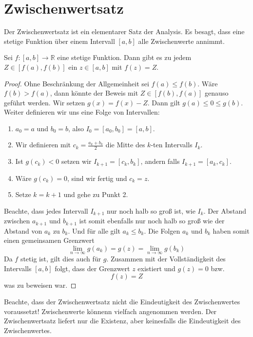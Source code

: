 \section{Zwischenwertsatz}

Der Zwischenwertsatz ist ein elementarer Satz der Analysis. Es besagt, dass eine stetige Funktion über einem Intervall $[a,b]$ alle Zwischenwerte annimmt.

\begin{satz}[Zwischenwertsatz]\label{satz:zwischen}
Sei $f:[a,b]\longrightarrow \mathbb{R}$ eine stetige Funktion. Dann gibt es zu jedem $Z\in[f(a),f(b)]$ ein $z\in [a,b]$ mit $f(z)=Z$.
\end{satz}
\begin{proof}
Ohne Beschränkung der Allgemeinheit sei $f(a)\le f(b)$. Wäre $f(b)>f(a)$, dann könnte der Beweis mit $Z\in[f(b),f(a)]$ genauso geführt werden. Wir setzen $g(x) = f(x)-Z$. Dann gilt $g(a)\le 0 \le g(b)$. Weiter definieren wir uns eine Folge von Intervallen:

\begin{enumerate}
\item $a_0 = a$ und $b_0 = b$, also $I_0 = [a_0,b_0]=[a,b]$.
\item Wir definieren mit $c_k = \frac{a_k +b_k}{2}$ die Mitte des $k$-ten Intervalls $I_k$.
\item Ist $g(c_k)<0$ setzen wir $I_{k+1} = [c_k,b_k]$, andern falls $I_{k+1}=[a_k,c_k]$.
\item Wäre $g(c_k)=0$, sind wir fertig und $c_k=z$.
\item Setze $k=k+1$ und gehe zu Punkt 2.
\end{enumerate}
Beachte, dass jedes Intervall $I_{k+1}$ nur noch halb so groß ist, wie $I_k$. Der Abstand zwischen $a_{k+1}$ und $b_{k+1}$ ist somit ebenfalls nur noch halb so groß wie der Abstand von $a_k$ zu $b_k$. Und für alle gilt $a_k\le b_k$. Die Folgen $a_k$ und $b_k$ haben somit einen gemeinsamen Grenzwert
\begin{equation}
\lim_{n\rightarrow \infty} g(a_k) =g(z)=\lim_{n\rightarrow \infty} g(b_k)
\end{equation}
Da $f$ stetig ist, gilt dies auch für $g$. Zusammen mit der Vollständigkeit des Intervalls $[a,b]$ folgt, dass der Grenzwert $z$ existiert und $g(z)=0$ bzw.
\begin{equation}
f(z)=Z
\end{equation}
was zu beweisen war.
\end{proof}

\begin{remark}
Beachte, dass der Zwischenwertsatz nicht die Eindeutigkeit des Zwischenwertes voraussetzt! Zwischenwerte könnenn vielfach angenommen werden. Der Zwischenwertsatz liefert nur die Existenz, aber keinesfalls die Eindeutigkeit des Zwischenwertes.
\end{remark}
